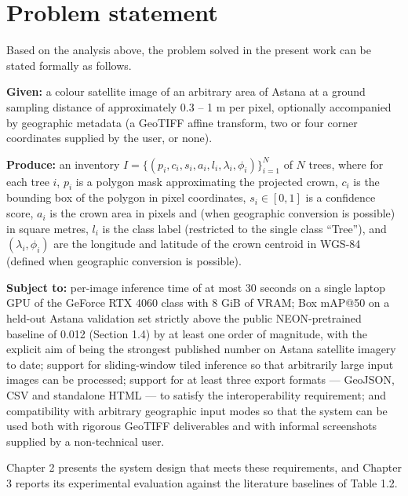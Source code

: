 \section{Problem statement}\label{problem-statement}

Based on the analysis above, the problem solved in the present work can be stated formally as follows.

\textbf{Given:} a colour satellite image of an arbitrary area of Astana at a ground sampling distance of approximately 0.3 -- 1 m per pixel, optionally accompanied by geographic metadata (a GeoTIFF affine transform, two or four corner coordinates supplied by the user, or none).

\textbf{Produce:} an inventory \(I = \{(p_i, c_i, s_i, a_i, l_i, \lambda_i, \phi_i)\}_{i=1}^{N}\) of \(N\) trees, where for each tree \(i\), \(p_i\) is a polygon mask approximating the projected crown, \(c_i\) is the bounding box of the polygon in pixel coordinates, \(s_i \in [0, 1]\) is a confidence score, \(a_i\) is the crown area in pixels and (when geographic conversion is possible) in square metres, \(l_i\) is the class label (restricted to the single class ``Tree''), and \((\lambda_i, \phi_i)\) are the longitude and latitude of the crown centroid in WGS-84 (defined when geographic conversion is possible).

\textbf{Subject to:} per-image inference time of at most 30 seconds on a single laptop GPU of the GeForce RTX 4060 class with 8 GiB of VRAM; Box mAP@50 on a held-out Astana validation set strictly above the public NEON-pretrained baseline of 0.012 (Section 1.4) by at least one order of magnitude, with the explicit aim of being the strongest published number on Astana satellite imagery to date; support for sliding-window tiled inference so that arbitrarily large input images can be processed; support for at least three export formats --- GeoJSON, CSV and standalone HTML --- to satisfy the interoperability requirement; and compatibility with arbitrary geographic input modes so that the system can be used both with rigorous GeoTIFF deliverables and with informal screenshots supplied by a non-technical user.

Chapter 2 presents the system design that meets these requirements, and Chapter 3 reports its experimental evaluation against the literature baselines of Table 1.2.

\newpage
